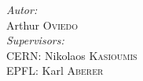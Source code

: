 \begin{titlepage}
\begin{center}
	\emph{Autor:} \\
	Arthur \textsc{Oviedo}\\
    \vspace{0.5cm}
    \emph{Supervisors:} \\   

    CERN: Nikolaos \textsc{Kasioumis} \\   
    EPFL: Karl \textsc{Aberer}\\

	\vspace{0.5cm}


\end{center}


\end{titlepage}

\newpage
\thispagestyle{empty}
\mbox{}